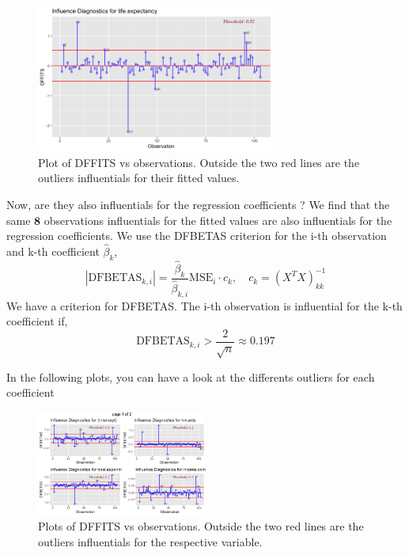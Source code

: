 \begin{figure}[H]
	\centering
	\includegraphics[width=0.7\textwidth]{figures/models/dffits.png}
	\caption{Plot of DFFITS vs observations. Outside the two red lines are the outliers influentials for their fitted values.}
	\label{fig:dffits}
\end{figure}

Now, are they also influentials for the regression coefficients ? We find that the same $\textbf{8}$ observations influentials for the fitted values are also influentials for the regression coefficients. We use the DFBETAS criterion for the i-th observation and k-th coefficient $\hat{\beta}_k$, 
\begin{equation}
	|\text{DFBETAS}_{k,i}| = \frac{\hat{\beta}_k}{\hat{\beta}_{k,i}}{\text{MSE}_i \cdot c_k}, \quad c_k = (X^T X)^{-1}_{kk}
\end{equation}
We have a criterion for DFBETAS. The i-th observation is influential for the k-th coefficient if, 
\begin{equation}
	\text{DFBETAS}_{k,i} > \frac{2}{\sqrt{n}} \approx 0.197
\end{equation}

In the following plots, you can have a look at the differents outliers for each coefficient
\begin{figure}[H]
	\centering
	\includegraphics[width=0.5\textwidth]{figures/models/dfbetas_1.png}
	\caption{Plots of DFFITS vs observations. Outside the two red lines are the outliers influentials for the respective variable.}
	\label{fig:dfbetas1}
\end{figure}

